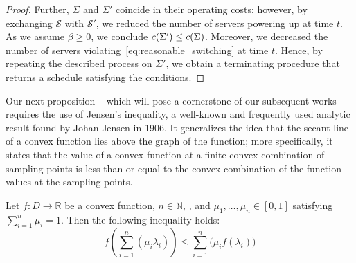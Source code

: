 \begin{proof}
Further, $\Sigma$ and $\Sigma'$ coincide in their operating costs; however, by exchanging $\mathcal{S}$ with $\mathcal{S}'$, we reduced the number of servers powering up at time $t$. As we assume $\beta\ge0$, we conclude $c(\Sigma')\le c(\Sigma)$. Moreover, we decreased the number of servers violating~\eqref{eq:reasonable_switching} at time $t$. Hence, by repeating the described process on $\Sigma'$, we obtain a terminating procedure that returns a schedule satisfying the conditions.
\end{proof}

Our next proposition -- which will pose a cornerstone of our subsequent works -- requires the use of Jensen's inequality, a well-known and frequently used analytic result found by Johan Jensen in 1906. It generalizes the idea that the secant line of a convex function lies above the graph of the function; more specifically, it states that the value of a convex function at a finite convex-combination of sampling points is less than or equal to the convex-combination of the function values at the sampling points.
\begin{lem}\label{lem:jensens-inequality}
Let $f:D\rightarrow\mathbb{R}$ be a convex function, $n\in\mathbb{N}$, , and $\mu_1,\dotsc,\mu_n\in[0,1]$ satisfying $\sum\limits_{i=1}^{n}\mu_i=1$. Then the following inequality holds:
\begin{equation*}
	f\left(\sum_{i=1}^n(\mu_i \lambda_i)\right) \le \sum_{i=1}^n\bigl(\mu_i f(\lambda_i)\bigr)
\end{equation*}
\end{lem}
